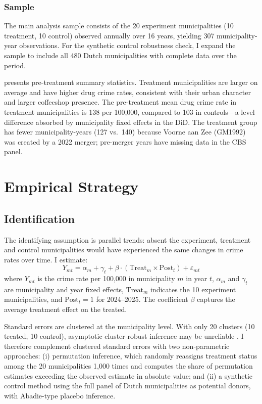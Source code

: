 \documentclass[12pt]{article}
\begin{document}
\subsubsection*{Sample} The main analysis sample consists of the 20 experiment municipalities (10 treatment, 10 control) observed annually over 16 years, yielding 307 municipality-year observations. For the synthetic control robustness check, I expand the sample to include all 480 Dutch municipalities with complete data over the period.



 presents pre-treatment summary statistics. Treatment municipalities are larger on average and have higher drug crime rates, consistent with their urban character and larger coffeeshop presence. The pre-treatment mean drug crime rate in treatment municipalities is 138 per 100,000, compared to 103 in controls---a level difference absorbed by municipality fixed effects in the DiD. The treatment group has fewer municipality-years (127 vs.\ 140) because Voorne aan Zee (GM1992) was created by a 2022 merger; pre-merger years have missing data in the CBS panel.


\section{Empirical Strategy}

\subsection{Identification}

The identifying assumption is parallel trends: absent the experiment, treatment and control municipalities would have experienced the same changes in crime rates over time. I estimate:
\begin{equation}
Y_{mt} = \alpha_m + \gamma_t + \beta \cdot (\text{Treat}_m \times \text{Post}_t) + \varepsilon_{mt}
\label{eq:did}
\end{equation}
where $Y_{mt}$ is the crime rate per 100,000 in municipality $m$ in year $t$, $\alpha_m$ and $\gamma_t$ are municipality and year fixed effects, $\text{Treat}_m$ indicates the 10 experiment municipalities, and $\text{Post}_t = 1$ for 2024--2025. The coefficient $\beta$ captures the average treatment effect on the treated.

Standard errors are clustered at the municipality level. With only 20 clusters (10 treated, 10 control), asymptotic cluster-robust inference may be unreliable \citep{cameron2008bootstrap}. I therefore complement clustered standard errors with two non-parametric approaches: (i) permutation inference, which randomly reassigns treatment status among the 20 municipalities 1,000 times and computes the share of permutation estimates exceeding the observed estimate in absolute value; and (ii) a synthetic control method \citep{abadie2010synthetic} using the full panel of Dutch municipalities as potential donors, with Abadie-type placebo inference.
\end{document}
